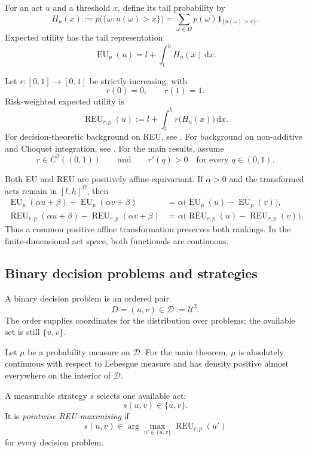\documentclass[11pt,a4paper]{article}
\theoremstyle{definition}
\newcommand{\REU}{\operatorname{REU}}
\newcommand{\EU}{\operatorname{EU}}
\newcommand{\D}{\mathcal D}
\newcommand{\U}{\mathcal U}
\newcommand{\dd}{\,\mathrm d}
\newcommand{\ind}{\mathbf 1}
\begin{document}
For an act $u$ and a threshold $x$, define its tail probability by
\[
 H_u(x)
 :=p\bigl(\{\omega:u(\omega)>x\}\bigr)
 =\sum_{\omega\in\Omega}p(\omega)
   \ind_{\{u(\omega)>x\}}.
\]
Expected utility has the tail representation
\begin{equation}\label{eq:eu-tail}
 \EU_p(u)
 =l+\int_l^h H_u(x)\dd x.
\end{equation}

Let $r:[0,1]\to[0,1]$ be strictly increasing, with
\[
 r(0)=0,
 \qquad
 r(1)=1.
\]
Risk-weighted expected utility is
\begin{equation}\label{eq:reu-act}
 \REU_{r,p}(u)
 :=l+\int_l^h r\bigl(H_u(x)\bigr)\dd x.
\end{equation}
For decision-theoretic background on REU, see \cite{Buchak2013}. For
background on non-additive and Choquet integration, see
\cite{Denneberg1994,Schmeidler1989}. For the main results, assume
\begin{equation}\label{eq:r-regularity}
 r\in C^2((0,1))
 \qquad\text{and}\qquad
 r'(q)>0\quad\text{for every }q\in(0,1).
\end{equation}

Both EU and REU are positively affine-equivariant. If $\alpha>0$ and the
transformed acts remain in $[l,h]^\Omega$, then
\begin{align*}
 \EU_p(\alpha u+\beta)-\EU_p(\alpha v+\beta)
 &=\alpha\bigl(\EU_p(u)-\EU_p(v)\bigr),\\
 \REU_{r,p}(\alpha u+\beta)-\REU_{r,p}(\alpha v+\beta)
 &=\alpha\bigl(\REU_{r,p}(u)-\REU_{r,p}(v)\bigr).
\end{align*}
Thus a common positive affine transformation preserves both rankings. In the
finite-dimensional act space, both functionals are continuous.

\subsection{Binary decision problems and strategies}

A binary decision problem is an ordered pair
\[
 D=(u,v)\in
 \D:=\U^2.
\]
The order supplies coordinates for the distribution over problems; the
available set is still $\{u,v\}$.

Let $\mu$ be a probability measure on $\D$. For the main theorem, $\mu$ is
absolutely continuous with respect to Lebesgue measure and has density
positive almost everywhere on the interior of $\D$.

A measurable strategy $s$ selects one available act:
\[
 s(u,v)\in\{u,v\}.
\]
It is \emph{pointwise REU-maximising} if
\[
 s(u,v)\in
 \arg\max_{u'\in\{u,v\}}\REU_{r,p}(u')
\]
for every decision problem.
\end{document}
